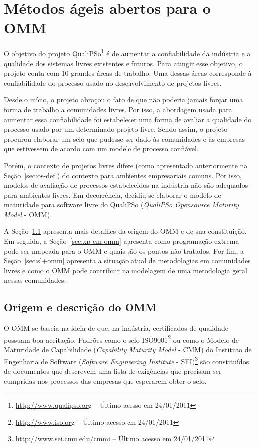 \chapter{Métodos ágeis abertos para o OMM}
\label{cap:omm}

O objetivo do projeto QualiPSo\footnote{\url{http://www.qualipso.org}
  -- Último acesso em 24/01/2011} é de aumentar a confiabilidade da
indústria e a qualidade dos sistemas livres existentes e futuros. Para
atingir esse objetivo, o projeto conta com 10 grandes áreas de
trabalho. Uma dessas áreas corresponde à confiabilidade do processo
usado no desenvolvimento de projetos livres.

Desde o início, o projeto abraçou o fato de que não poderia jamais
forçar uma forma de trabalho a comunidades livres. Por isso, a
abordagem usada para aumentar essa confiabilidade foi estabelecer uma
forma de avaliar a qualidade do processo usado por um determinado
projeto livre. Sendo assim, o projeto procurou elaborar um selo que
pudesse ser dado às comunidades e às empresas que estivessem de acordo
com um modelo de processo confiável.

Porém, o contexto de projetos livres difere (como apresentado
anteriormente na Seção~\ref{sec:os-def}) do contexto para ambientes
empresariais comuns. Por isso, modelos de avaliação de processos
estabelecidos na indústria não são adequados para ambientes livres. Em
decorrência, decidiu-se elaborar o modelo de maturidade para software
livre do QualiPSo (\textit{QualiPSo Opensource Maturity Model} - OMM).

A Seção~\ref{sec:o-que-eh-omm} apresenta mais detalhes da origem do
OMM e de sua constituição. Em seguida, a Seção~\ref{sec:xp-em-omm}
apresenta como programação extrema pode ser mapeada para o OMM e quais
são os pontos não tratados. Por fim, a Seção~\ref{sec:sl+omm}
apresenta a situação atual de metodologias em comunidades livres e
como o OMM pode contribuir na modelagem de uma metodologia geral
nessas comunidades.

\section{Origem e descrição do OMM}
\label{sec:o-que-eh-omm}

O OMM se baseia na ideia de que, na indústria, certificados de
qualidade possuam boa aceitação. Padrões como o selo
ISO9001\footnote{\url{http://www.iso.org} -- Último acesso em
  24/01/2011} ou como o Modelo de Maturidade de Capabilidade
(\textit{Capability Maturity Model} - CMM) do Instituto de Engenharia
de Software (\textit{Software Engineering Institute} -
SEI)\footnote{\url{http://www.sei.cmu.edu/cmmi} -- Último acesso em
  24/01/2011} são constituídos de documentos que descrevem uma lista
de exigências que precisam ser cumpridas nos processos das empresas
que esperarem obter o selo.

